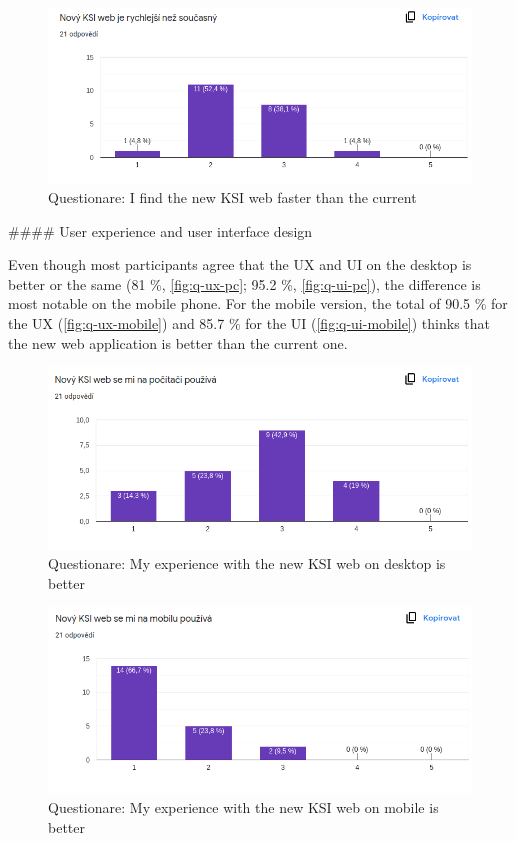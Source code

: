 \documentclass[
  digital, %
  oneside, %
  lof,     %
  lot,     %
]{fithesis4}
\begin{document}
{\begin{figure}
\includegraphics[width=\textwidth]{assets/img/questionare/faster}
\caption{Questionare: I find the new KSI web faster than the current}
\label{fig:q-speed}
\end{figure}


#### User experience and user interface design

Even though most participants agree that the UX and UI on the desktop is better or the same (81 \%, \autoref{fig:q-ux-pc}; 95.2 \%, \autoref{fig:q-ui-pc}), the difference is most notable on the mobile phone. For the mobile version, the total of 90.5 \% for the UX (\autoref{fig:q-ux-mobile}) and  85.7 \% for the UI (\autoref{fig:q-ui-mobile}) thinks that the new web application is better than the current one.

\begin{figure}
\includegraphics[width=\textwidth]{assets/img/questionare/pc-ux}
\caption{Questionare: My experience with the new KSI web on desktop is better}
\label{fig:q-ux-pc}
\end{figure}

\begin{figure}
\includegraphics[width=\textwidth]{assets/img/questionare/mobile-ux}
\caption{Questionare: My experience with the new KSI web on mobile is better}
\label{fig:q-ux-mobile}
\end{figure}

}
\end{document}
